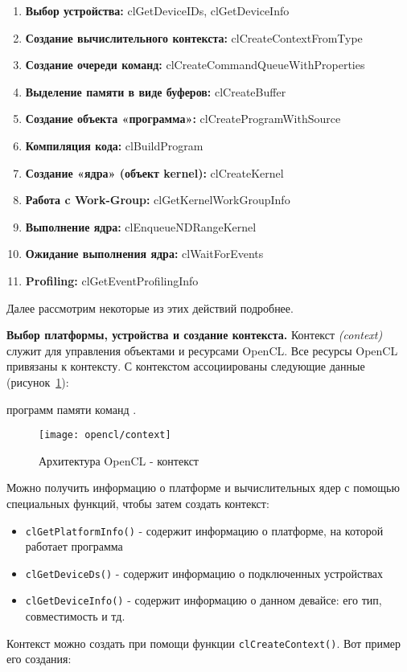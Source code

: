 {\begin{enumerate}
			\item\textbf{Выбор устройства:} clGetDeviceIDs, clGetDeviceInfo
			\item\textbf{Создание вычислительного контекста:} cl\-Create\-Context\-From\-Type
			\item\textbf{Создание очереди команд:} cl\-Create\-Command\-Queue\-With\-Pro\-per\-ties
			\item\textbf{Выделение памяти в виде буферов:} clCreateBuffer
			\item\textbf{Создание объекта «программа»:} clCreateProgramWithSource
			\item\textbf{Компиляция кода:} clBuildProgram
			\item\textbf{Создание «ядра» (объект kernel):} clCreateKernel
			\item\textbf{Работа c Work-Group:} clGetKernelWorkGroupInfo 
			\item\textbf{Выполнение ядра:} clEnqueueNDRangeKernel 
			\item\textbf{Ожидание выполнения ядра:} clWaitForEvents 
			\item\textbf{Profiling:} clGetEventProfilingInfo
		\end{enumerate}
	Далее рассмотрим некоторые из этих действий подробнее.
	\par\textbf{Выбор платформы, устройства и создание контекста.} Контекст \textit{(context)} служит для управления объектами и ресурсами OpenCL. Все ресурсы OpenCL привязаны к контексту. С контекстом ассоциированы следующие данные (рисунок~\ref{OpenCLContext:image}):
		\begin{itemize}
			 программ
			 памяти
			 команд \cite{Bastrakov2011}.
		\end{itemize}
	\begin{figure}[H]
		\texttt{[image: opencl/context]}
		\caption{Архитектура OpenCL - контекст}
		\label{OpenCLContext:image}
	\end{figure}
	Можно получить информацию о платформе и вычислительных ядер с помощью специальных функций, чтобы затем создать контекст:
		\begin{itemize}
			\item\texttt{clGetPlatformInfo()} - содержит информацию о платформе, на которой работает программа
			\item\texttt{clGetDeviceDs()} - содержит информацию о подключенных устройствах
			\item\texttt{clGetDeviceInfo()} - содержит информацию о данном девайсе: его тип, совместимость и тд.
		\end{itemize}
	Контекст можно создать при помощи функции \texttt{clCreateContext()}. Вот пример его создания:

}
